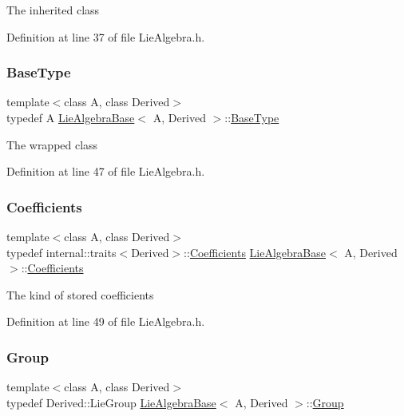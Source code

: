 The inherited class 

Definition at line 37 of file Lie\+Algebra.\+h.

\hypertarget{class_lie_algebra_base_ae7884e2973ffa35f8b209b2831a066a1}{}\label{class_lie_algebra_base_ae7884e2973ffa35f8b209b2831a066a1} 
\subsubsection{\texorpdfstring{Base\+Type}{BaseType}}
{\footnotesize\ttfamily template$<$class A, class Derived$>$ \\
typedef A \hyperlink{class_lie_algebra_base}{Lie\+Algebra\+Base}$<$ A, Derived $>$\+::\hyperlink{class_lie_algebra_base_ae7884e2973ffa35f8b209b2831a066a1}{Base\+Type}}

The wrapped class 

Definition at line 47 of file Lie\+Algebra.\+h.

\hypertarget{class_lie_algebra_base_a8e61a02d3c5f7a0b4bd87a4ccd47dc9a}{}\label{class_lie_algebra_base_a8e61a02d3c5f7a0b4bd87a4ccd47dc9a} 
\subsubsection{\texorpdfstring{Coefficients}{Coefficients}}
{\footnotesize\ttfamily template$<$class A, class Derived$>$ \\
typedef internal\+::traits$<$Derived$>$\+::\hyperlink{class_lie_algebra_base_a8e61a02d3c5f7a0b4bd87a4ccd47dc9a}{Coefficients} \hyperlink{class_lie_algebra_base}{Lie\+Algebra\+Base}$<$ A, Derived $>$\+::\hyperlink{class_lie_algebra_base_a8e61a02d3c5f7a0b4bd87a4ccd47dc9a}{Coefficients}}

The kind of stored coefficients 

Definition at line 49 of file Lie\+Algebra.\+h.

\hypertarget{class_lie_algebra_base_aab4a5b7a728102ffe801534c0fc10d79}{}\label{class_lie_algebra_base_aab4a5b7a728102ffe801534c0fc10d79} 
\subsubsection{\texorpdfstring{Group}{Group}}
{\footnotesize\ttfamily template$<$class A, class Derived$>$ \\
typedef Derived\+::\+Lie\+Group \hyperlink{class_lie_algebra_base}{Lie\+Algebra\+Base}$<$ A, Derived $>$\+::\hyperlink{class_lie_algebra_base_aab4a5b7a728102ffe801534c0fc10d79}{Group}}

